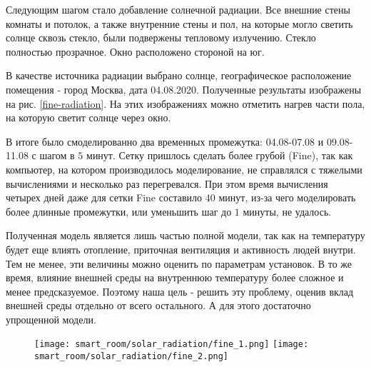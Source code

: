Следующим шагом стало добавление солнечной радиации.
Все внешние стены комнаты и потолок, а также внутренние стены и пол, на которые могло светить солнце сквозь стекло, были подвержены тепловому излучению. Стекло полностью прозрачное. Окно расположено стороной на юг.

В качестве источника радиации выбрано солнце, географическое расположение помещения - город Москва, дата 04.08.2020.
Полученные результаты изображены на рис. \ref{fine-radiation}. На этих изображениях можно отметить нагрев части пола, на которую светит солнце через окно.

В итоге было смоделированно два временных промежутка: 04.08-07.08 и 09.08-11.08 с шагом в $5$ минут. Сетку пришлось сделать более грубой (Fine), так как компьютер, на котором производилось моделирование, не справлялся с тяжелыми вычислениями и несколько раз перегревался. При этом время вычисления четырех дней даже для сетки Fine составило $40$ минут, из-за чего моделировать более длинные промежутки, или уменьшить шаг до $1$ минуты, не удалось. 

Полученная модель является лишь частью полной модели, так как на температуру будет еще влиять отопление, приточная вентиляция и активность людей внутри. Тем не менее, эти величины можно оценить по параметрам установок. В то же время, влияние внешней среды на внутреннюю температуру более сложное и менее предсказуемое. Поэтому наша цель - решить эту проблему, оценив вклад внешней среды отдельно от всего остального. А для этого достаточно упрощенной модели.

\begin{figure}[H]
\texttt{[image: smart\_room/solar\_radiation/fine\_1.png]}\hfill
\texttt{[image: smart\_room/solar\_radiation/fine\_2.png]}\hfill
\end{figure}

